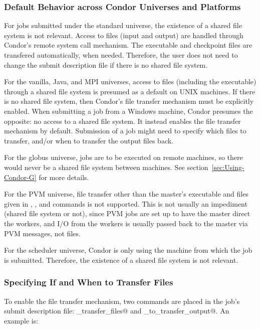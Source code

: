 \subsubsection{Default Behavior across Condor Universes and Platforms}

For jobs submitted under the standard universe,
the existence of a shared file system is not relevant.
Access to files (input and output) are handled through Condor's
remote system call mechanism.
The executable and checkpoint files are transfered automatically, when
needed. 
Therefore, the user does not need to change the submit description
file if there is no shared file system.

For the vanilla, Java, and MPI universes, access to files (including
the executable) through a shared file system is presumed as a default
on UNIX machines.
If there is no shared file system, then Condor's file transfer
mechanism must be explicitly enabled.
When submitting a job from a Windows machine,
Condor presumes the opposite: no access to a shared file system.
It instead enables the file transfer mechanism by default.
Submission of a job might need to specify which files to
transfer, and/or when to transfer the output files back.

For the globus universe,
jobs are to be executed on remote machines, so there would never
be a shared file system between machines.
See section~\ref{sec:Using-Condor-G} for more details.

For the PVM universe,
file transfer other than the master's executable and files given in
\verb@input@,
\verb@output@, and
\verb@error@ commands is not supported.
This is not usually an impediment (shared file system or not), since
PVM jobs are set up to have the master direct the workers, and I/O
from the workers is usually passed back to the master via PVM
messages, not files.

For the scheduler universe,
Condor is only using the machine from which the job is submitted.
Therefore, the existence of a shared file system is not relevant.


\subsubsection{Specifying If and When to Transfer Files
\label{sec:file-transfer-if-when}}

To enable the file transfer mechanism, two commands are
placed in the job's submit description file:
\verb@should_transfer_files@ and \verb@when_to_transfer_output@.
An example is:

